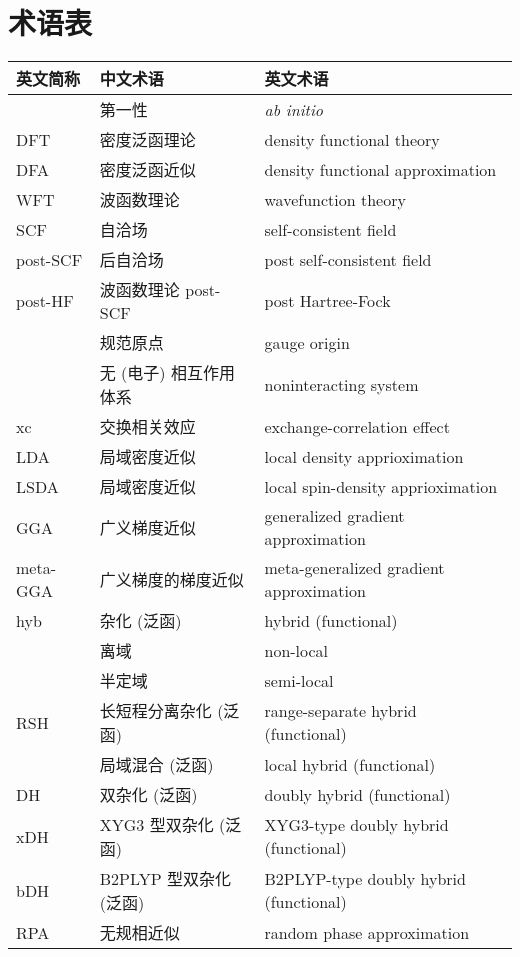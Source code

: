 
\chapter{术语表}

\begin{longtable}{lll}
    \hline
    英文简称 & 中文术语 & 英文术语 \\ \hline
    \endhead
    \hline
    \endfoot
    & 第一性 & \emph{ab initio} \\
    DFT & 密度泛函理论 & density functional theory \\
    DFA & 密度泛函近似 & density functional approximation \\
    WFT & 波函数理论 & wavefunction theory \\
    SCF & 自洽场 & self-consistent field \\
    post-SCF & 后自洽场 & post self-consistent field \\
    post-HF & 波函数理论 post-SCF & post Hartree-Fock \\
    & 规范原点 & gauge origin \\
    & 无 (电子) 相互作用体系 & noninteracting system \\
    xc & 交换相关效应 & exchange-correlation effect \\
    LDA & 局域密度近似 & local density apprioximation \\
    LSDA & 局域密度近似 & local spin-density apprioximation \\
    GGA & 广义梯度近似 & generalized gradient approximation \\
    meta-GGA & 广义梯度的梯度近似 & meta-generalized gradient approximation \\
    hyb & 杂化 (泛函) & hybrid (functional) \\
    & 离域 & non-local \\
    & 半定域 & semi-local \\
    RSH & 长短程分离杂化 (泛函) & range-separate hybrid (functional) \\
    & 局域混合 (泛函) & local hybrid (functional) \\
    DH & 双杂化 (泛函) & doubly hybrid (functional) \\
    xDH & XYG3 型双杂化 (泛函) & XYG3-type doubly hybrid (functional) \\
    bDH & B2PLYP 型双杂化 (泛函) & B2PLYP-type doubly hybrid (functional) \\
    RPA & 无规相近似 & random phase approximation \\

\end{longtable}
